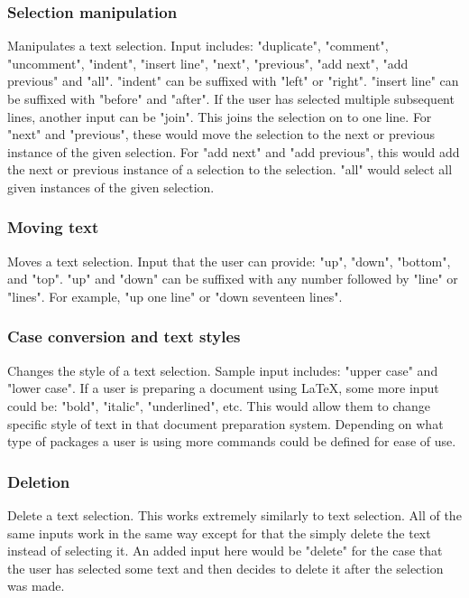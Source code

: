 \documentclass[11pt, oneside]{article}
\begin{document}
	\subsubsection{Selection manipulation \hfill {}}
	Manipulates a text selection. Input includes: "duplicate", "comment", "uncomment", "indent", "insert line", "next", "previous", "add next", "add previous" and "all". "indent" can be suffixed with "left" or "right". "insert line" can be suffixed with "before" and "after". If the user has selected multiple subsequent lines, another input can be "join". This joins the selection on to one line. For "next" and "previous", these would move the selection to the next or previous instance of the given selection. For "add next" and "add previous", this would add the next or previous instance of a selection to the selection. "all" would select all given instances of the given selection.


	\subsubsection{Moving text \hfill {}}
	Moves a text selection. Input that the user can provide: "up", "down", "bottom", and "top". "up" and "down" can be suffixed with any number followed by "line" or "lines". For example, "up one line" or "down seventeen lines".

	\subsubsection{Case conversion and text styles \hfill {}}
	Changes the style of a text selection. Sample input includes: "upper case" and "lower case". If a user is preparing a document using \LaTeX, some more input could be: "bold", "italic", "underlined", etc. This would allow them to change specific style of text in that document preparation system. Depending on what type of packages a user is using more commands could be defined for ease of use.

	\subsubsection{Deletion \hfill {}}
	Delete a text selection. This works extremely similarly to text selection. All of the same inputs work in the same way except for that the simply delete the text instead of selecting it. An added input here would be "delete" for the case that the user has selected some text and then decides to delete it after the selection was made.
\end{document}
